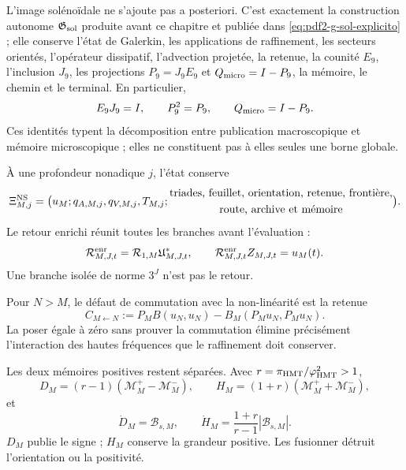 L'image solénoïdale ne s'ajoute pas a posteriori. C'est exactement la construction
autonome $\mathfrak G_{\rm sol}$ produite avant ce chapitre et publiée dans
\eqref{eq:pdf2-g-sol-explicito} ; elle conserve l'état
de Galerkin, les applications de raffinement, les secteurs orientés, l'opérateur dissipatif,
l'advection projetée, la retenue, la counité $E_9$, l'inclusion $J_9$, les
projections $P_9=J_9E_9$ et $Q_{\rm micro}=I-P_9$, la mémoire, le chemin et le terminal.
En particulier,
\[
 E_9J_9=I,
 \qquad P_9^2=P_9,
 \qquad Q_{\rm micro}=I-P_9.
\]
Ces identités typent la décomposition entre publication macroscopique et mémoire
microscopique ; elles ne constituent pas à elles seules une borne globale.

À une profondeur nonadique $j$, l'état conserve
\begin{equation}\label{eq:pdf2-ns-estado}
 \Xi_{M,j}^{\rm NS}=
 \bigl(u_M;q_{A,M,j},q_{V,M,j},T_{M,j};
 \begin{gathered}
 \text{triades, feuillet, orientation, retenue, frontière,}\\
 \text{route, archive et mémoire}
 \end{gathered}
 \bigr).
\end{equation}
Le retour enrichi réunit toutes les branches avant l'évaluation :
\begin{equation}\label{eq:pdf2-ns-retorno}
 \mathcal R_{M,J,t}^{\rm enr}
 =\mathcal R_{1,M}\mathfrak U_{M,J,t}^*,
 \qquad
 \mathcal R_{M,J,t}^{\rm enr}Z_{M,J,t}=u_M(t).
\end{equation}
Une branche isolée de norme $3^J$ n'est pas le retour.

Pour $N>M$, le défaut de commutation avec la non-linéarité est la retenue
\begin{equation}\label{eq:pdf2-ns-carry}
 C_{M\leftarrow N}:=
 P_MB(u_N,u_N)-B_M(P_Mu_N,P_Mu_N).
\end{equation}
La poser égale à zéro sans prouver la commutation élimine précisément l'interaction des
hautes fréquences que le raffinement doit conserver.

Les deux mémoires positives restent séparées. Avec
$r=\pi_{\rm HMT}/\varphi_{\rm HMT}^2>1$,
\begin{equation}\label{eq:pdf2-ns-dh}
 D_M=(r-1)(\mathcal M_M^+-\mathcal M_M^-),
 \qquad
 H_M=(1+r)(\mathcal M_M^++\mathcal M_M^-),
\end{equation}
et
\[
 \dot D_M=\mathscr B_{s,M},
 \qquad
 \dot H_M=\frac{1+r}{r-1}|\mathscr B_{s,M}|.
\]
$D_M$ publie le signe ; $H_M$ conserve la grandeur positive. Les fusionner détruit
l'orientation ou la positivité.

